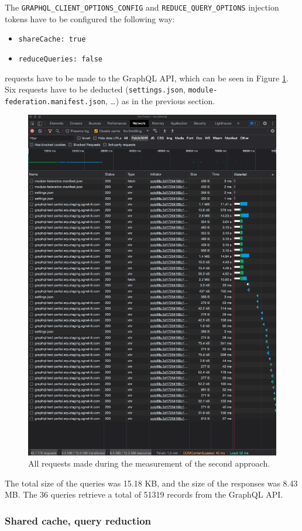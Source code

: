 \noindent The \texttt{GRAPHQL\_CLIENT\_OPTIONS\_CONFIG} and \texttt{REDUCE\_QUERY\_OPTIONS} injection tokens have to be configured the following way:

\begin{itemize}
  \item \texttt{shareCache: true}
  \item \texttt{reduceQueries: false}
\end{itemize}

 requests have to be made to the GraphQL \ac{API}, which can be seen in Figure \ref{fig:results:shared-cache-no-reduction}. Six requests have to be deducted (\texttt{settings.json}, \texttt{module-federation.manifest.json}, \dots) as in the previous section.

\ifshowImages
\begin{figure}[H]
\centering
\includegraphics[width=0.7\linewidth]{images/results/1-attempt/shared-not-reduced-cache.png}
\caption{All requests made during the measurement of the second approach.}\label{fig:results:shared-cache-no-reduction}
\end{figure}
\fi

\noindent The total size of the queries was 15.18 KB, and the size of the responses was 8.43 MB. The 36 queries retrieve a total of 51319 records from the GraphQL \ac{API}.

\subsubsection{Shared cache, query reduction}\label{subsubsection:results:performance-measurement:separate-cache-reduction}

